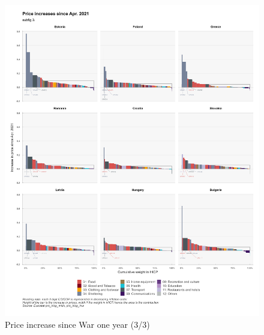 \documentclass[
  9pt,
  a4paper,
  DIV=11,
  numbers=noendperiod]{scrartcl}
\begin{document}
\begin{figure}

\caption{Price increase since War one year (3/3)}

{\centering \includegraphics[width=17cm,height=\textheight]{../svg/depuis_1y_3.png}

}

\end{figure}
\end{document}
